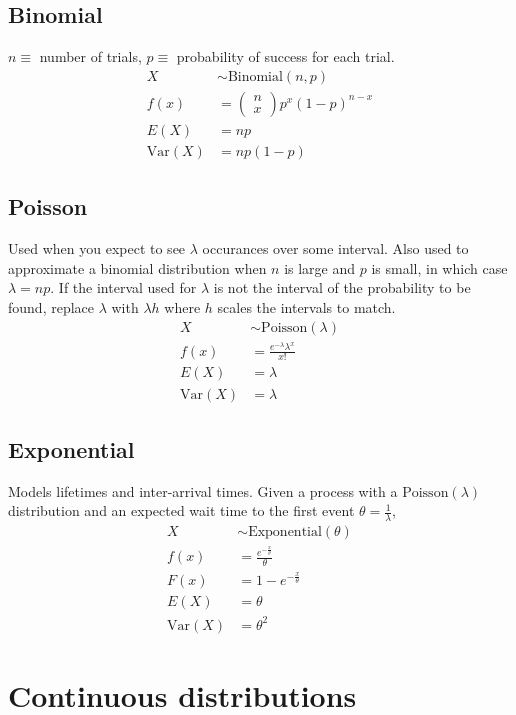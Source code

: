 \documentclass{article}
\newcommand{\var}{\text{Var}}
\newcommand{\binomial}{\text{Binomial}}
\newcommand{\poisson}{\text{Poisson}}
\newcommand{\exponential}{\text{Exponential}}
\begin{document}
\begin{multicols*}{2}
\subsection{Binomial}
$n \equiv$ number of trials, $p \equiv$ probability of success for each trial.
\begin{align*}
    X &\sim \binomial(n, p) \\
    f(x) &= \begin{pmatrix}
        n \\
        x
    \end{pmatrix} p^x (1-p)^{n-x} \\
    E(X) &= np \\
    \var(X) &= np(1-p)
\end{align*}

\subsection{Poisson}
Used when you expect to see $\lambda$ occurances over some interval. Also used to approximate a binomial distribution when $n$ is large and $p$ is small, in which case $\lambda = np$. If the interval used for $\lambda$ is not the interval of the probability to be found, replace $\lambda$ with $\lambda h$ where $h$ scales the intervals to match.
\begin{align*}
    X &\sim \poisson(\lambda) \\
    f(x) &= \frac{e^{-\lambda} \lambda^x}{x!} \\
    E(X) &= \lambda \\
    \var(X) &= \lambda
\end{align*}

\subsection{Exponential}
Models lifetimes and inter-arrival times. Given a process with a $\poisson(\lambda)$ distribution and an expected wait time to the first event $\theta = \frac{1}{\lambda}$,
\begin{align*}
    X &\sim \exponential(\theta) \\
    f(x) &= \frac{e^{-\frac{x}{\theta}}}{\theta} \\
    F(x) &= 1 - e^{-\frac{x}{\theta}} \\
    E(X) &= \theta \\
    \var(X) &= \theta^2
\end{align*}

\section{Continuous distributions}


\end{multicols*}
\end{document}
